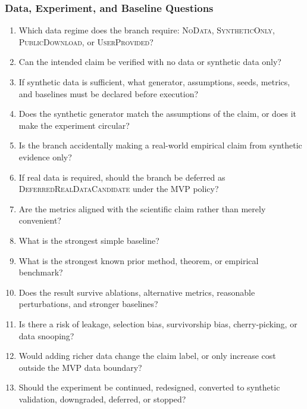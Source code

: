 \documentclass[11pt]{article}
\begin{document}
\subsubsection*{Data, Experiment, and Baseline Questions}
\begin{enumerate}[leftmargin=*]
    \item Which data regime does the branch require: \textsc{NoData}, \textsc{SyntheticOnly}, \textsc{PublicDownload}, or \textsc{UserProvided}?
    \item Can the intended claim be verified with no data or synthetic data only?
    \item If synthetic data is sufficient, what generator, assumptions, seeds, metrics, and baselines must be declared before execution?
    \item Does the synthetic generator match the assumptions of the claim, or does it make the experiment circular?
    \item Is the branch accidentally making a real-world empirical claim from synthetic evidence only?
    \item If real data is required, should the branch be deferred as \textsc{DeferredRealDataCandidate} under the MVP policy?
    \item Are the metrics aligned with the scientific claim rather than merely convenient?
    \item What is the strongest simple baseline?
    \item What is the strongest known prior method, theorem, or empirical benchmark?
    \item Does the result survive ablations, alternative metrics, reasonable perturbations, and stronger baselines?
    \item Is there a risk of leakage, selection bias, survivorship bias, cherry-picking, or data snooping?
    \item Would adding richer data change the claim label, or only increase cost outside the MVP data boundary?
    \item Should the experiment be continued, redesigned, converted to synthetic validation, downgraded, deferred, or stopped?
\end{enumerate}
\end{document}
